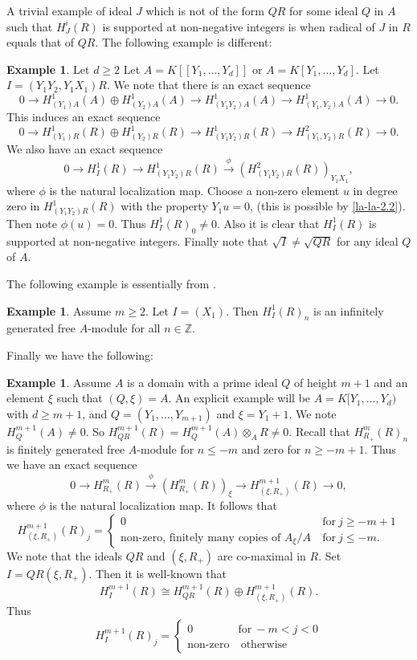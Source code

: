 \documentclass{amsart}
\newcommand{\ZZ}{\mathbb{Z} }
\newcommand{\rt}{\rightarrow}
\theoremstyle{plain}
\theoremstyle{definition}
\newtheorem{example}[theorem]{Example}
\theoremstyle{remark}
\begin{document}
A trivial example of ideal $J$ which is not of the form $QR$ for some ideal $Q$ in $A$ such that $H^i_J(R)$ is supported at non-negative integers is when radical of $J$ in $R$ equals that of $QR$. The following example is different:
\begin{example}\label{ex-2.2}
Let $d \geq 2$
Let $A = K[[Y_1,\ldots, Y_d]]$ or $A = K[Y_1,\dots, Y_d]$. Let $I = (Y_1Y_2, Y_1X_1)R$. We note that there is an exact sequence
\begin{equation}\label{la-la-2.2}
0 \rt H^1_{(Y_1)A}(A) \oplus H^1_{(Y_2)A}(A)  \rt H^1_{(Y_1Y_2)A}(A)  \rt H^1_{(Y_1, Y_2)A}(A)  \rt 0.
\end{equation}
This induces an exact sequence
\[
0 \rt H^1_{(Y_1)R}(R) \oplus H^1_{(Y_2)R}(R)  \rt H^1_{(Y_1Y_2)R}(R)  \rt H^2_{(Y_1, Y_2)R}(R)  \rt 0.
\]
We also have an exact sequence
\[
0 \rt H^1_I(R) \rt H^1_{(Y_1Y_2)R}(R) \xrightarrow{\phi} \left(H^2_{(Y_1Y_2)R}(R)\right)_{Y_1X_1},
\]
where $\phi$ is the natural localization map.
Choose a non-zero  element $u$ in degree zero in $H^1_{(Y_1Y_2)R}(R)$  with the property $Y_1u = 0$, (this is possible by \ref{la-la-2.2}). Then note 
$\phi(u) = 0$. Thus $H^1_I(R)_0 \neq 0$. Also it is clear that $H^1_I(R)$ is supported at non-negative integers. Finally note that $\sqrt{I} \neq \sqrt{QR}$ for any ideal $Q$ of $A$.
\end{example}
The following example is essentially  from \cite[15.1.8]{BS}.
\begin{example}\label{ex-3}
 Assume $m \geq 2$. Let $I = (X_1)$. Then $H^1_I(R)_n$ is an infinitely generated free $A$-module for all $n \in \ZZ$.
\end{example}
Finally we have the following:
\begin{example}\label{finnal-ex-peculair}
Assume $A$ is a domain  with a prime ideal $Q$ of height $m+1$ and an element $\xi$ such that
$(Q,\xi) = A$. An explicit example will be $A = K[Y_1,\ldots, Y_d)$ with $d \geq m+ 1$, and $Q = (Y_1,\ldots, Y_{m+1})$ and $\xi = Y_1  + 1$. We note
$H^{m+1}_Q(A) \neq 0$. So $H^{m+1}_{QR}(R) =  H^{m+1}_Q(A)\otimes_A R \neq 0$.
Recall that $H^m_{R_+}(R)_n $ is  finitely generated  free $A$-module for $n \leq -m$ and zero for $n \geq -m + 1$. Thus we have an exact sequence
\[
0 \rt H^m_{R_+}(R) \xrightarrow{\phi} \left(H^m_{R_+}(R)\right)_\xi \rt H^{m+1}_{(\xi, R_+)}(R) \rt 0,
\]
where $\phi$ is the natural localization map. It follows that
\[
 H^{m+1}_{(\xi, R_+)}(R)_j = \begin{cases}
 0 & \text{for} \ j \geq -m + 1 \\
 \text{non-zero, finitely many copies  of $A_\xi/A$} \  & \text{for} \ j \leq -m.
\end{cases}
\]
We note that the ideals $QR$ and $(\xi, R_+)$ are co-maximal in $R$.
Set $I = QR(\xi, R_+)$. Then it is well-known that
\[
H^{m+1}_I(R) \cong H^{m+1}_{QR}(R) \oplus H^{m+1}_{(\xi, R_+)}(R).
\]
Thus 
\[
 H^{m+1}_{I}(R)_j = \begin{cases}
 0 & \text{for} \  -m < j < 0\\
 \text{non-zero}  &  \ \text{otherwise} 
\end{cases}
\]

\end{example}
\end{document}
